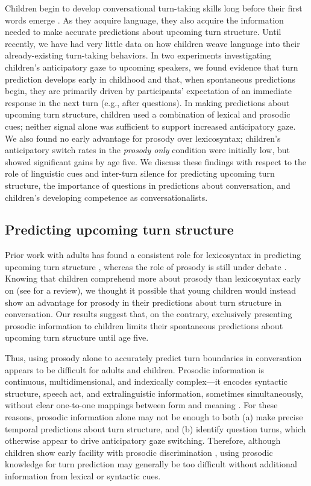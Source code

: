 \documentclass[authoryear, 12pt]{elsarticle}
\begin{document}
Children begin to develop conversational turn-taking skills long before their first words emerge \citep{bateson1975, hilbrink2015, jaffe2001, snow1977}. As they acquire language, they also acquire the information needed to make accurate predictions about upcoming turn structure. Until recently, we have had very little data on how children weave language into their already-existing turn-taking behaviors. In two experiments investigating children's anticipatory gaze to upcoming speakers, we found evidence that turn prediction develops early in childhood and that, when spontaneous predictions begin, they are primarily driven by participants' expectation of an immediate response in the next turn (e.g., after questions). In making predictions about upcoming turn structure, children used a combination of lexical and prosodic cues; neither signal alone was sufficient to support increased anticipatory gaze. We also found no early advantage for prosody over lexicosyntax; children's anticipatory switch rates in the \textit{prosody only} condition were initially low, but showed significant gains by age five. We discuss these findings with respect to the role of linguistic cues and inter-turn silence for predicting upcoming turn structure, the importance of questions in predictions about conversation, and children's developing competence as conversationalists.

\subsection*{Predicting upcoming turn structure}

Prior work with adults has found a consistent role for lexicosyntax in predicting upcoming turn structure \citep{de-ruiter2006, magyari2012}, whereas the role of prosody is still under debate \citep{duncan1972, ford1996, torreira2015}. Knowing that children comprehend more about prosody than lexicosyntax early on (see \citealp{speer2009} for a review), we thought it possible that young children would instead show an advantage for prosody in their predictions about turn structure in conversation. Our results suggest that, on the contrary, exclusively presenting prosodic information to children limits their spontaneous predictions about upcoming turn structure until age five.

Thus, using prosody alone to accurately predict turn boundaries in conversation appears to be difficult for adults and children. Prosodic information is continuous, multidimensional, and indexically complex---it encodes syntactic structure, speech act, and extralinguistic information, sometimes simultaneously, without clear one-to-one mappings between form and meaning \citep{cutler1997, shriberg1998, lammertink2015}. For these reasons, prosodic information alone may not be enough to both (a) make precise temporal predictions about turn structure, and (b) identify question turns, which otherwise appear to drive anticipatory gaze switching. Therefore, although children show early facility with prosodic discrimination \citep{nazzi2003, soderstrom2003, johnson2001, jusczyk1995, morgan1995, mehler1988}, using prosodic knowledge for turn prediction may generally be too difficult without additional information from lexical or syntactic cues.
\end{document}
